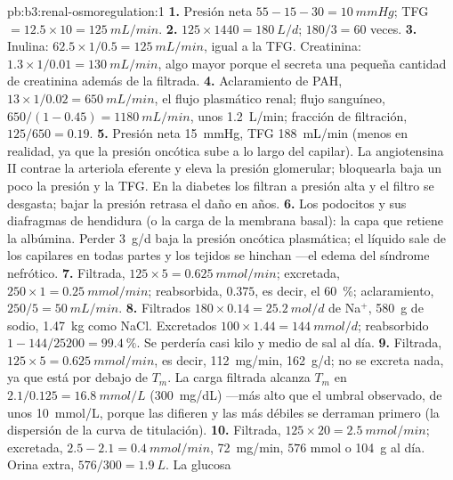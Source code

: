 \begin{solution}{pb:b3:renal-osmoregulation:1}
\textbf{1.} Presión neta $55 - 15 - 30 = \qty{10}{mmHg}$; TFG $= 12.5
\times 10 = \qty{125}{mL/min}$.
\textbf{2.} $125\times 1440 = \qty{180}{L/d}$; $180/3 = 60$ veces.
\textbf{3.} Inulina: $62.5\times 1/0.5 = \qty{125}{mL/min}$, igual a la
TFG. Creatinina: $1.3\times 1/0.01 = \qty{130}{mL/min}$, algo mayor
porque el  secreta una pequeña cantidad de creatinina
además de la filtrada.
\textbf{4.} Aclaramiento de PAH, $13\times 1/0.02 = \qty{650}{mL/min}$,
el flujo plasmático renal; flujo sanguíneo,
$650/(1 - 0.45) = \qty{1180}{mL/min}$, unos \qty{1.2}{L/min}; fracción
de filtración, $125/650 = 0.19$.
\textbf{5.} Presión neta \qty{15}{mmHg}, TFG \qty{188}{mL/min} (menos en
realidad, ya que la presión oncótica sube a lo largo del capilar). La
angiotensina II contrae la arteriola eferente y eleva la presión
glomerular; bloquearla baja un poco la presión y la TFG. En la diabetes
los  filtran a presión alta y el filtro se desgasta; bajar la
presión retrasa el daño en años.
\textbf{6.} Los podocitos y sus diafragmas de hendidura (o la carga de
la membrana basal): la capa que retiene la albúmina. Perder
\qty{3}{g/d} baja la presión oncótica plasmática; el líquido sale de
los capilares en todas partes y los tejidos se hinchan ---el edema del
síndrome nefrótico.
\textbf{7.} Filtrada, $125\times 5 = \qty{0.625}{mmol/min}$; excretada,
$250\times 1 = \qty{0.25}{mmol/min}$; reabsorbida, $0.375$, es decir, el
\qty{60}{\%}; aclaramiento, $250/5 = \qty{50}{mL/min}$.
\textbf{8.} Filtrados $180\times 0.14 = \qty{25.2}{mol/d}$ de Na$^{+}$,
\qty{580}{g} de sodio, \qty{1.47}{kg} como NaCl. Excretados $100\times 1.44
= \qty{144}{mmol/d}$; reabsorbido $1 - 144/\num{25200} = \qty{99.4}{\%}$.
Se perdería casi kilo y medio de sal al día.
\textbf{9.} Filtrada, $125\times 5 = \qty{0.625}{mmol/min}$, es decir,
\qty{112}{mg/min}, \qty{162}{g/d}; no se excreta nada, ya que está por
debajo de $T_{m}$. La carga filtrada alcanza $T_{m}$ en $2.1/0.125 =
\qty{16.8}{mmol/L}$ (\qty{300}{mg/dL}) ---más alto que el umbral
observado, de unos \qty{10}{mmol/L}, porque las  difieren y las
más débiles se derraman primero (la dispersión de la curva de
titulación).
\textbf{10.} Filtrada, $125\times 20 = \qty{2.5}{mmol/min}$; excretada,
$2.5 - 2.1 = \qty{0.4}{mmol/min}$, \qty{72}{mg/min}, $576$ mmol o
\qty{104}{g} al día. Orina extra, $576/300 = \qty{1.9}{L}$. La glucosa

\end{solution}

